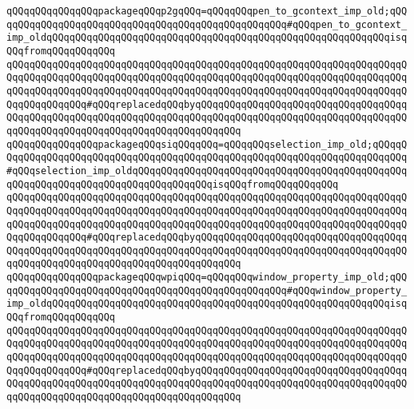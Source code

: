 \newline
\verb|qQQqqQQqqQQqqQQqpackageqQQqp2gqQQq=qQQqqQQqpen_to_gcontext_imp_old;qQQqqQQqqQQqqQQqqQQqqQQqqQQqqQQqqQQqqQQqqQQqqQQqqQQq#qQQqpen_to_gcontext_imp_oldqQQqqQQqqQQqqQQqqQQqqQQqqQQqqQQqqQQqqQQqqQQqqQQqqQQqqQQqqQQqisqQQqfromqQQqqQQqqQQq|\newline
\verb|qQQqqQQqqQQqqQQqqQQqqQQqqQQqqQQqqQQqqQQqqQQqqQQqqQQqqQQqqQQqqQQqqQQqqQQqqQQqqQQqqQQqqQQqqQQqqQQqqQQqqQQqqQQqqQQqqQQqqQQqqQQqqQQqqQQqqQQqqQQqqQQqqQQqqQQqqQQqqQQqqQQqqQQqqQQqqQQqqQQqqQQqqQQqqQQqqQQqqQQqqQQqqQQqqQQqqQQqqQQqqQQq#qQQqreplacedqQQqbyqQQqqQQqqQQqqQQqqQQqqQQqqQQqqQQqqQQqqQQqqQQqqQQqqQQqqQQqqQQqqQQqqQQqqQQqqQQqqQQqqQQqqQQqqQQqqQQqqQQqqQQqqQQqqQQqqQQqqQQqqQQqqQQqqQQqqQQqqQQqqQQqqQQq|\newline
\newline
\verb|qQQqqQQqqQQqqQQqpackageqQQqsiqQQqqQQq=qQQqqQQqselection_imp_old;qQQqqQQqqQQqqQQqqQQqqQQqqQQqqQQqqQQqqQQqqQQqqQQqqQQqqQQqqQQqqQQqqQQqqQQqqQQq#qQQqselection_imp_oldqQQqqQQqqQQqqQQqqQQqqQQqqQQqqQQqqQQqqQQqqQQqqQQqqQQqqQQqqQQqqQQqqQQqqQQqqQQqqQQqqQQqisqQQqfromqQQqqQQqqQQq|\newline
\verb|qQQqqQQqqQQqqQQqqQQqqQQqqQQqqQQqqQQqqQQqqQQqqQQqqQQqqQQqqQQqqQQqqQQqqQQqqQQqqQQqqQQqqQQqqQQqqQQqqQQqqQQqqQQqqQQqqQQqqQQqqQQqqQQqqQQqqQQqqQQqqQQqqQQqqQQqqQQqqQQqqQQqqQQqqQQqqQQqqQQqqQQqqQQqqQQqqQQqqQQqqQQqqQQqqQQqqQQqqQQqqQQq#qQQqreplacedqQQqbyqQQqqQQqqQQqqQQqqQQqqQQqqQQqqQQqqQQqqQQqqQQqqQQqqQQqqQQqqQQqqQQqqQQqqQQqqQQqqQQqqQQqqQQqqQQqqQQqqQQqqQQqqQQqqQQqqQQqqQQqqQQqqQQqqQQqqQQqqQQqqQQqqQQq|\newline
\newline
\verb|qQQqqQQqqQQqqQQqpackageqQQqwpiqQQq=qQQqqQQqwindow_property_imp_old;qQQqqQQqqQQqqQQqqQQqqQQqqQQqqQQqqQQqqQQqqQQqqQQqqQQq#qQQqwindow_property_imp_oldqQQqqQQqqQQqqQQqqQQqqQQqqQQqqQQqqQQqqQQqqQQqqQQqqQQqqQQqqQQqisqQQqfromqQQqqQQqqQQq|\newline
\verb|qQQqqQQqqQQqqQQqqQQqqQQqqQQqqQQqqQQqqQQqqQQqqQQqqQQqqQQqqQQqqQQqqQQqqQQqqQQqqQQqqQQqqQQqqQQqqQQqqQQqqQQqqQQqqQQqqQQqqQQqqQQqqQQqqQQqqQQqqQQqqQQqqQQqqQQqqQQqqQQqqQQqqQQqqQQqqQQqqQQqqQQqqQQqqQQqqQQqqQQqqQQqqQQqqQQqqQQqqQQqqQQq#qQQqreplacedqQQqbyqQQqqQQqqQQqqQQqqQQqqQQqqQQqqQQqqQQqqQQqqQQqqQQqqQQqqQQqqQQqqQQqqQQqqQQqqQQqqQQqqQQqqQQqqQQqqQQqqQQqqQQqqQQqqQQqqQQqqQQqqQQqqQQqqQQqqQQqqQQqqQQqqQQq|\newline
